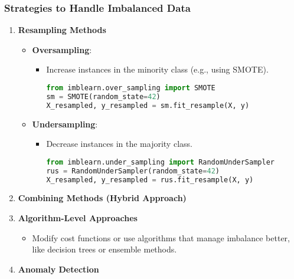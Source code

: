 \documentclass[aspectratio=169]{beamer}
\begin{document}
\begin{frame}[fragile]
    \frametitle{Strategies to Handle Imbalanced Data}
    \begin{enumerate}
        \item \textbf{Resampling Methods}
        \begin{itemize}
            \item \textbf{Oversampling}: 
            \begin{itemize}
                \item Increase instances in the minority class (e.g., using SMOTE).
                \begin{lstlisting}[language=Python]
from imblearn.over_sampling import SMOTE
sm = SMOTE(random_state=42)
X_resampled, y_resampled = sm.fit_resample(X, y)
                \end{lstlisting}
            \end{itemize}

            \item \textbf{Undersampling}: 
            \begin{itemize}
                \item Decrease instances in the majority class.
                \begin{lstlisting}[language=Python]
from imblearn.under_sampling import RandomUnderSampler
rus = RandomUnderSampler(random_state=42)
X_resampled, y_resampled = rus.fit_resample(X, y)
                \end{lstlisting}
            \end{itemize}
        \end{itemize}
        
        \item \textbf{Combining Methods (Hybrid Approach)}
        \item \textbf{Algorithm-Level Approaches}
        \begin{itemize}
            \item Modify cost functions or use algorithms that manage imbalance better, like decision trees or ensemble methods.
        \end{itemize}
        \item \textbf{Anomaly Detection}
    \end{enumerate}
\end{frame}
\end{document}
